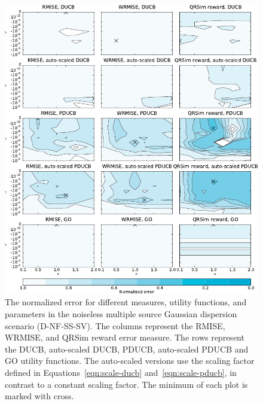 \begin{figure}
    \centering
    \includegraphics{plots/psearch-D-NF-MS-SV}
    \caption[Normalized error (D-NF-MS-SV)]{The normalized error for different 
        measures, utility functions, and parameters in the noiseless multiple 
        source Gaussian dispersion scenario (D-NF-SS-SV).  The columns represent 
        the RMISE, WRMISE, and QRSim reward error measure.  The rows represent 
        the DUCB, auto-scaled DUCB, PDUCB, auto-scaled PDUCB and GO utility 
        functions. The auto-scaled versions use the scaling factor defined in 
        Equations~\ref{eqn:scale-ducb} and~\ref{eqn:scale-pducb}, in contrast to 
        a constant scaling factor.  The minimum of each plot is marked with 
        cross.}\label{fig:psearch-D-NF-MS-SV}
\end{figure}

\newenvironment{errtbl}{\begin{tabular}{lllSSSS}\toprule}{\bottomrule\end{tabular}}
\newcommand*{\errtblhead}[1]{
        & & &
        \multicolumn{2}{c}{#1} &
        \multicolumn{2}{c}{Norm.\ #1} \\
        \cmidrule(lr){4-5} \cmidrule(lr){6-7}

        Utility function &
        \multicolumn{1}{l}{$\kappa$} &
        \multicolumn{1}{l}{$\gamma$} &
        \multicolumn{1}{c}{Mean} &
        \multicolumn{1}{c}{SD} &
        \multicolumn{1}{c}{Mean} &
        \multicolumn{1}{c}{SD} \\
        & & &
        \multicolumn{1}{c}{\si{\nano\gram\per\meter\cubed}} &
        \multicolumn{1}{c}{\si{\nano\gram\per\meter\cubed}} &
        & \\ \midrule }

